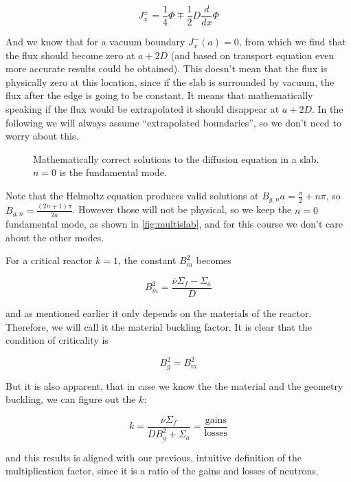 \[
J_x^\pm=\frac{1}{4}\Phi\mp\frac{1}{2}D\frac{d}{dx}\Phi
\]

And we know that for a vacuum boundary $J_x^-(a)=0$, from which we find that the flux should become zero at $a+2D$ (and based on transport equation even more accurate results could be obtained). This doesn't mean that the flux is physically zero at this location, since if the slab is surrounded by vacuum, the flux after the edge is going to be constant. It means that mathematically speaking if the flux would be extrapolated it should disappear at $a+2D$. In the following we will always assume ``extrapolated boundaries'', so we don't need to worry about this.

\begin{figure}[ht!]
\protect {}\protect
\caption{\label{fig:multislab} \footnotesize{Mathematically correct solutions to the diffusion equation in a slab. $n=0$ is the fundamental mode.}}
\end{figure} 

Note that the Helmoltz equation produces valid solutions at $B_{g,n}a=\frac{\pi}{2}+n\pi$, so $B_{g,n}=\frac{(2n+1)\pi}{2a}$. However those will not be physical, so we keep the $n=0$ fundamental mode, as shown in \autoref{fig:multislab}, and for this course we don't care about the other modes.

For a critical reactor $k=1$, the constant $B_m^2$ becomes

$$B_m^2=\frac{\bar\nu\Sigma_f-\Sigma_a}{D}$$

\noindent and as mentioned earlier it only depends on the materials of the reactor. Therefore, we will call it the material buckling factor. It is clear that the condition of criticality is

\begin{equation}
B_g^2=B_m^2
\end{equation}

But it is also apparent, that in case we know the the material and the geometry buckling, we can figure out the $k$:

\begin{equation}
k=\frac{\bar\nu\Sigma_f}{DB_g^2+\Sigma_a}=\frac{\text{gains}}{\text{losses}}
\end{equation}

\noindent and this results is aligned with our previous, intuitive definition of the multiplication factor, since it is a ratio of the gains and losses of neutrons.

